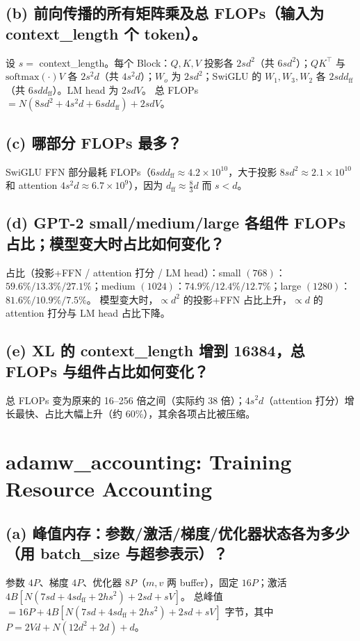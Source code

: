 \documentclass[12pt]{ctexart}
\begin{document}
\subsection{(b) 前向传播的所有矩阵乘及总 FLOPs（输入为 context\_length 个 token）。}
设 $s=$ context\_length。每个 Block：$Q,K,V$ 投影各 $2sd^2$（共 $6sd^2$）；$QK^{\top}$ 与 $\text{softmax}(\cdot)V$ 各 $2s^2d$（共 $4s^2d$）；$W_o$ 为 $2sd^2$；SwiGLU 的 $W_1,W_3,W_2$ 各 $2sdd_{\text{ff}}$（共 $6sdd_{\text{ff}}$）。LM head 为 $2sdV$。
总 FLOPs $=N(8sd^2+4s^2d+6sdd_{\text{ff}})+2sdV$。

\subsection{(c) 哪部分 FLOPs 最多？}
SwiGLU FFN 部分最耗 FLOPs（$6sdd_{\text{ff}}\approx4.2\times10^{10}$，大于投影 $8sd^2\approx2.1\times10^{10}$ 和 attention $4s^2d\approx6.7\times10^{9}$），因为 $d_{\text{ff}}\approx\frac83d$ 而 $s<d$。

\subsection{(d) GPT-2 small/medium/large 各组件 FLOPs 占比；模型变大时占比如何变化？}
占比（投影+FFN / attention 打分 / LM head）：small $(768)$：$59.6\%/13.3\%/27.1\%$；medium $(1024)$：$74.9\%/12.4\%/12.7\%$；large $(1280)$：$81.6\%/10.9\%/7.5\%$。
模型变大时，$\propto d^2$ 的投影+FFN 占比上升，$\propto d$ 的 attention 打分与 LM head 占比下降。

\subsection{(e) XL 的 context\_length 增到 16384，总 FLOPs 与组件占比如何变化？}
总 FLOPs 变为原来的 16--256 倍之间（实际约 38 倍）；$4s^2d$（attention 打分）增长最快、占比大幅上升（约 60\%），其余各项占比被压缩。

\section{adamw\_accounting: Training Resource Accounting}

\subsection{(a) 峰值内存：参数/激活/梯度/优化器状态各为多少（用 batch\_size 与超参表示）？}
参数 $4P$、梯度 $4P$、优化器 $8P$（$m,v$ 两 buffer），固定 $16P$；激活 $4B[N(7sd+4sd_{\text{ff}}+2hs^2)+2sd+sV]$。
总峰值 $=16P+4B[N(7sd+4sd_{\text{ff}}+2hs^2)+2sd+sV]$ 字节，其中 $P=2Vd+N(12d^2+2d)+d$。
\end{document}

